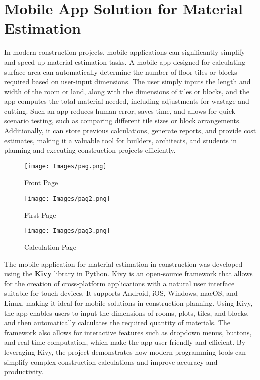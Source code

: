 \documentclass[12pt,a4paper,openany,titlepage,reqno, final]{report}
\theoremstyle{definition}
\begin{document}
	\section{Mobile App Solution for Material Estimation}
	\noindent In modern construction projects, mobile applications can significantly simplify and speed up material estimation tasks. A mobile app designed for calculating surface area can automatically determine the number of floor tiles or blocks required based on user-input dimensions. The user simply inputs the length and width of the room or land, along with the dimensions of tiles or blocks, and the app computes the total material needed, including adjustments for wastage and cutting. Such an app reduces human error, saves time, and allows for quick scenario testing, such as comparing different tile sizes or block arrangements. Additionally, it can store previous calculations, generate reports, and provide cost estimates, making it a valuable tool for builders, architects, and students in planning and executing construction projects efficiently.
	
		\begin{figure}[h!]
		\centering
		\texttt{[image: Images/pag.png]}
		\caption{Front Page}
		\label{fig:pag}
	\end{figure}
		\begin{figure}[h!]
		\centering
		\texttt{[image: Images/pag2.png]}
		\caption{First Page}
		\label{fig:pag2}
	\end{figure}
		\begin{figure}[h!]
		\centering
		\texttt{[image: Images/pag3.png]}
		\caption{Calculation Page}
		\label{fig:pag3}
	\end{figure}
	\noindent The mobile application for material estimation in construction was developed using the \textbf{Kivy} library in Python. Kivy is an open-source framework that allows for the creation of cross-platform applications with a natural user interface suitable for touch devices. It supports Android, iOS, Windows, macOS, and Linux, making it ideal for mobile solutions in construction planning. Using Kivy, the app enables users to input the dimensions of rooms, plots, tiles, and blocks, and then automatically calculates the required quantity of materials. The framework also allows for interactive features such as dropdown menus, buttons, and real-time computation, which make the app user-friendly and efficient. By leveraging Kivy, the project demonstrates how modern programming tools can simplify complex construction calculations and improve accuracy and productivity.
\end{document}
